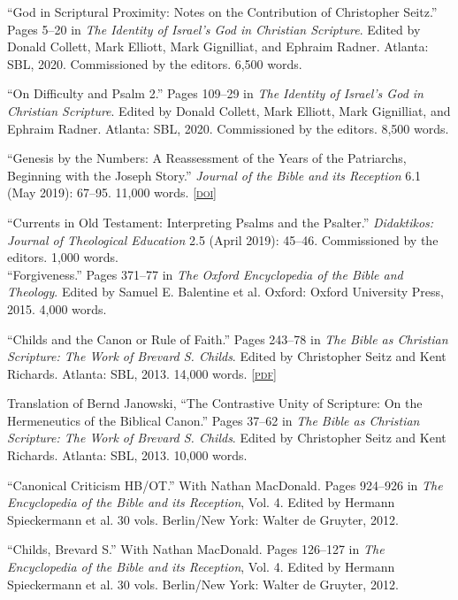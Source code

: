 \documentclass[11pt]{article}
\newcommand{\pdf}[1]{\href{#1}{\footnotesize\textsc{[pdf]}}}
\newcommand{\doi}[1]{\href{https://doi.org/#1}{\footnotesize\textsc{[doi]}}}
\newcommand{\years}[1]{\marginnote{\footnotesize #1}}
\begin{document}
\years{2020}
``God in Scriptural Proximity: Notes on the Contribution of Christopher
Seitz.'' Pages 5--20 in \emph{The Identity of Israel’s God in Christian
Scripture}. Edited by Donald Collett, Mark Elliott, Mark Gignilliat, and
Ephraim Radner. Atlanta: SBL, 2020. Commissioned by the editors. 6,500
words.

\years{2020}
``On Difficulty and Psalm 2.'' Pages 109--29 in \emph{The Identity of
Israel’s God in Christian Scripture}. Edited by Donald Collett, Mark
Elliott, Mark Gignilliat, and Ephraim Radner. Atlanta: SBL, 2020.
Commissioned by the editors. 8,500 words.

\years{2019}
``Genesis by the Numbers: A Reassessment of the Years of the Patriarchs,
Beginning with the Joseph Story.'' \emph{Journal of the Bible and its
Reception} 6.1 (May 2019): 67–95. 11,000 words.
\doi{10.1515/jbr-2019-1003}

\years{2019}
``Currents in Old Testament: Interpreting Psalms and the Psalter.''
\emph{Didaktikos: Journal of Theological Education} 2.5 (April 2019):
45–46. Commissioned by the editors. 1,000 words.
\\%

\years{2015}
``Forgiveness.'' Pages 371--77 in \emph{The Oxford Encyclopedia of the
Bible and Theology}. Edited by Samuel E. Balentine et al. Oxford: Oxford
University Press, 2015. 4,000 words.

\years{2013}
``Childs and the Canon or Rule of Faith.'' Pages 243--78 in \emph{The
Bible as Christian Scripture: The Work of Brevard S. Childs}. Edited by
Christopher Seitz and Kent Richards. Atlanta: SBL, 2013. 14,000 words.
\pdf{http://danieldriver.com/assets/pdf/publications/Driver_2013.pdf}

\years{2013}
Translation of Bernd Janowski, ``The Contrastive Unity of Scripture: On
the Hermeneutics of the Biblical Canon.'' Pages 37--62 in \emph{The
Bible as Christian Scripture: The Work of Brevard S. Childs}. Edited by
Christopher Seitz and Kent Richards. Atlanta: SBL, 2013. 10,000 words.

\years{2012}%
``Canonical Criticism HB/OT.'' With Nathan MacDonald. Pages 924–926 in
\emph{The Encyclopedia of the Bible and its Reception}, Vol. 4. Edited
by Hermann Spieckermann et al. 30 vols. Berlin/New York: Walter de
Gruyter, 2012.

\years{2012}
``Childs, Brevard S.'' With Nathan MacDonald. Pages 126–127 in \emph{The
Encyclopedia of the Bible and its Reception}, Vol. 4. Edited by Hermann
Spieckermann et al. 30 vols. Berlin/New York: Walter de Gruyter, 2012.
\end{document}
